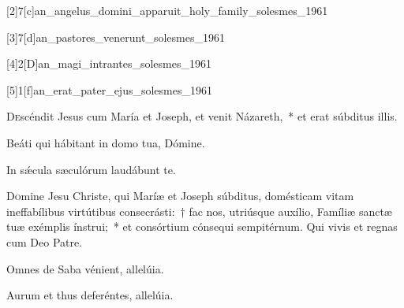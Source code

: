 \documentclass[vesperale_romanum.tex]{subfiles}
\begin{document}


[2]{7}[c]{an_angelus_domini_apparuit_holy_family_solesmes_1961}


[3]{7}[d]{an_pastores_venerunt_solesmes_1961}


[4]{2}[D]{an_magi_intrantes_solesmes_1961}
\label{ps_126_2}


[5]{1}[f]{an_erat_pater_ejus_solesmes_1961}



\lettrine{D}{e}scéndit Jesus cum María et Joseph, et venit Názareth,~* et erat súbditus illis.

\hymnus


\vv Beáti qui hábitant in domo tua, Dómine.

\rr In sǽcula sæculórum laudábunt te.


\oratio \label{or_sanctae_familiae}

\lettrine{D}{o}mine Jesu Christe, qui Maríæ et Joseph súbditus, domésticam vitam ineffabílibus virtútibus consecrásti:~† fac nos, utriúsque auxílio, Famíliæ sanctæ tuæ exémplis ínstrui;~* et consórtium cónsequi sempitérnum. Qui vivis et regnas cum Deo Patre.

\label{com_dom_in_oct_epiphaniae}
{}



\vv  Omnes de Saba vénient, allelúia.

\rr Aurum et thus deferéntes, allelúia.
\end{document}
